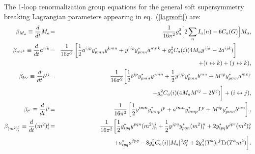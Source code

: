 \documentclass[11pt]{article}
\def\beq{\begin{eqnarray}}
\def\eeq{\end{eqnarray}}
\begin{document}
The 1-loop renormalization group equations for the
general soft supersymmetry breaking Lagrangian parameters appearing in
eq.~(\ref{lagrsoft}) are:
\beq
\beta_{M_a} \equiv 
{d\over dt} M_a 
\!&=&\! 
{1\over 16\pi^2} g_a^2 \Bigl [2 \sum_n I_a(n) - 6 C_a(G) \Bigr ] M_a
,
\\
\beta_{a^{ijk}} \equiv \frac{d}{dt} a^{ijk}
\!&=&\!
\frac{1}{16 \pi^2} \left [
\frac{1}{2} a^{ijp} y^*_{pmn} y^{kmn} 
+ y^{ijp} y^*_{pmn} a^{mnk}
+ g_a^2 C_a(i) (4 M_a y^{ijk}  - 2 a^{ijk}) 
\right ]\phantom{xxxx}
\nonumber \\ &&
+ (i \leftrightarrow k)
+ (j \leftrightarrow k)
,\\
\beta_{b^{ij}} \equiv \frac{d}{dt} b^{ij}
\!&=&\!
\frac{1}{16 \pi^2} 
\biggl [
\frac{1}{2} b^{ip} y^*_{pmn} y^{jmn} 
+ \frac{1}{2} y^{ijp} y^*_{pmn} b^{mn} 
+ M^{ip} y^*_{pmn} a^{mnj}
\nonumber \\ &&
+  g_a^2 C_a(i) (4 M_a M^{ij}  - 2 b^{ij})
\biggr ]
+ (i \leftrightarrow j) 
,
\\
\beta_{t^{i}} \equiv \frac{d}{dt} t^{i}
\!&=&\!
\frac{1}{16 \pi^2} \left [
\frac{1}{2} y^{imn} y^*_{mnp} t^p 
+ a^{imn} y^*_{mnp} L^p
+ M^{ip} y^*_{pmn} b^{mn} 
\right ],
\\
\beta_{(m^2)_{i}^j} \equiv \frac{d}{dt} (m^2)_{i}^j
\!&=&\!
\frac{1}{16 \pi^2} \biggl [
\frac{1}{2} y_{ipq}^* y^{pqn} (m^2)_n^j
+ \frac{1}{2} y^{jpq} y_{pqn}^* (m^2)_i^n
+ 2 y^*_{ipq} y^{jpr} (m^2)_r^q
\nonumber \\ &&
+ a^*_{ipq} a^{jpq}
- 8 g_a^2 C_a(i) |M_a|^2 \delta_i^j
+ 2 g_a^2 (T^a)_i{}^j
{\rm Tr}(T^a m^2)
\biggr ]
.
\eeq
\end{document}
